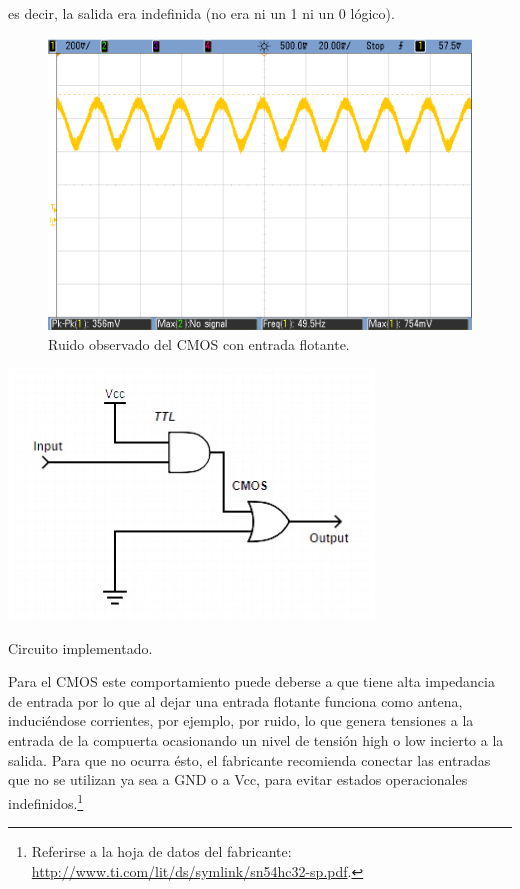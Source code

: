  es decir, la salida era indefinida (no era ni un 1 ni un 0 lógico). 
 \vspace{5mm}
\begin{figure}[H]
    \centering
    \includegraphics[width=.5\linewidth]{./ruidoCMOS.png}
    \caption{Ruido observado del CMOS con entrada flotante.}
    \label{fig:ruidoCMOS}
\end{figure}

\vspace{20mm}
\begin{table}
    \begin{center}
        \includegraphics[scale=0.5]{./circuito.jpg}
        \caption{Circuito implementado.}
        \label{fig:circuito}
    \end{center}
\end{table} 
\par
\vspace{10mm}
Para el CMOS este comportamiento puede deberse a que tiene alta impedancia de entrada por lo que al dejar una entrada flotante
funciona como antena, induciéndose corrientes, por ejemplo, por ruido, lo que genera tensiones a la entrada de la compuerta
ocasionando un nivel de tensión high o low incierto a la salida.
Para que no ocurra ésto, el fabricante recomienda conectar las entradas que no se utilizan ya sea a GND o a Vcc, 
para evitar estados operacionales indefinidos.\footnote{Referirse a la hoja de datos del fabricante: \url{http://www.ti.com/lit/ds/symlink/sn54hc32-sp.pdf}.}\\\newline


